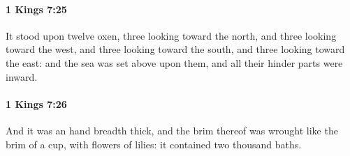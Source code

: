 		\paragraph{1 Kings 7:25} %
			\label{1KINGS-7-25}

			It stood upon twelve oxen, three looking toward the north, and three looking toward the west, and three looking toward the south, and three looking toward the east: and the sea was set above upon them, and all their hinder parts were inward.


		\paragraph{1 Kings 7:26} %
			\label{1KINGS-7-26}

			And it was an hand breadth thick, and the brim thereof was wrought like the brim of a cup, with flowers of lilies: it contained two thousand baths.

